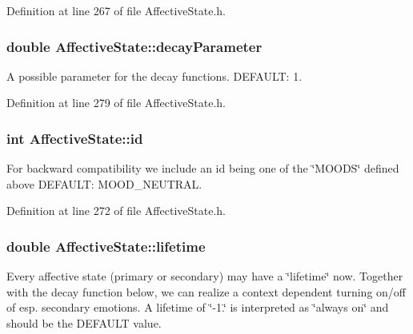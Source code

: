 \-Definition at line 267 of file \-Affective\-State.\-h.

\hypertarget{class_affective_state_a80ee188d27e7b36c94ac9c1f9ddb3cb7}{
\subsubsection[{decay\-Parameter}]{\setlength{\rightskip}{0pt plus 5cm}double {\bf \-Affective\-State\-::decay\-Parameter}}}
\label{class_affective_state_a80ee188d27e7b36c94ac9c1f9ddb3cb7}
\-A possible parameter for the decay functions. \-D\-E\-F\-A\-U\-L\-T\-: 1. 

\-Definition at line 279 of file \-Affective\-State.\-h.

\hypertarget{class_affective_state_a5db5a1c7f76aba385d216010bcc74509}{
\subsubsection[{id}]{\setlength{\rightskip}{0pt plus 5cm}int {\bf \-Affective\-State\-::id}}}
\label{class_affective_state_a5db5a1c7f76aba385d216010bcc74509}
\-For backward compatibility we include an id being one of the \char`\"{}\-M\-O\-O\-D\-S\char`\"{} defined above \-D\-E\-F\-A\-U\-L\-T\-: \-M\-O\-O\-D\-\_\-\-N\-E\-U\-T\-R\-A\-L. 

\-Definition at line 272 of file \-Affective\-State.\-h.

\hypertarget{class_affective_state_ae067f508a2053daf7541bf0901e38b67}{
\subsubsection[{lifetime}]{\setlength{\rightskip}{0pt plus 5cm}double {\bf \-Affective\-State\-::lifetime}}}
\label{class_affective_state_ae067f508a2053daf7541bf0901e38b67}
\-Every affective state (primary or secondary) may have a \char`\"{}lifetime\char`\"{} now. \-Together with the decay function below, we can realize a context dependent turning on/off of esp. secondary emotions. \-A lifetime of \char`\"{}-\/1.\char`\"{} is interpreted as \char`\"{}always on\char`\"{} and should be the \-D\-E\-F\-A\-U\-L\-T value. 

